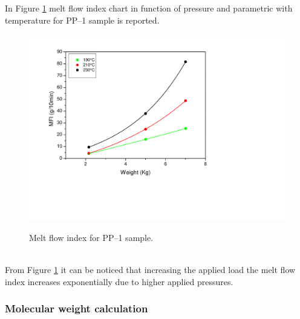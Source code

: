 \documentclass[a4paper, 11pt]{article}
\begin{document}
In Figure \ref{fig:mfi2} melt flow index chart in function of pressure and parametric with temperature for PP–1 sample is reported.
\begin{figure}[h!]
	\centering
	{\includegraphics[scale=0.4]{mfi2}}
	\captionsetup{justification=centering}
	\caption{Melt flow index for PP–1 sample.}
	\label{fig:mfi2}
\end{figure}\\
From Figure \ref{fig:mfi2} it can be noticed that increasing the applied load the melt flow index increases exponentially due to higher applied pressures.

\subsubsection{Molecular weight calculation}
\end{document}
